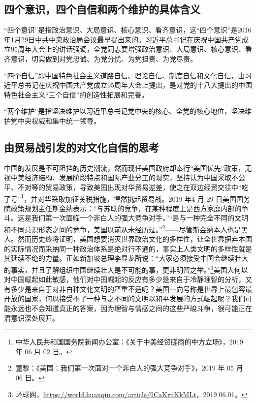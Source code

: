 \documentclass{ctexart}
\begin{document}
\subsection{四个意识，四个自信和两个维护的具体含义}
“四个意识”是指政治意识、大局意识、核心意识、看齐意识，这“四个意识”是2016年1月29日中共中央政治局会议最早提出来的。习近平总书记在庆祝中国共产党成立95周年大会上的讲话强调，全党同志要增强政治意识、大局意识、核心意识、看齐意识，切实做到对党忠诚、为党分忧、为党担责、为党尽责。

“四个自信”即中国特色社会主义道路自信、理论自信、制度自信和文化自信，由习近平总书记在庆祝中国共产党成立95周年大会上提出，是对党的十八大提出的中国特色社会主义“三个自信”的创造性拓展和完善。

“两个维护”是指坚决维护以习近平总书记党中央的核心、全党的核心地位，坚决维护党中央权威和集中统一领导。

\subsection{由贸易战引发的对文化自信的思考}
中国的发展是不可阻挡的历史潮流，然而现任美国政府却奉行“美国优先”政策，无视中美经济结构、发展阶段特点和国际产业分工的现实，坚持认为中国采取不公平、不对等的贸易政策，导致美国出现对华贸易逆差，使之在双边经贸交往中“吃了亏”\footnote{中华人民共和国国务院新闻办公室：《关于中美经贸磋商的中方立场》，2019 年 06 月 02 日。}，并对华采取加征关税措施，悍然挑起贸易战。2019 年4 月 29 日美国国务院政策规划主任斯金纳表示：“与苏联的竞争，在某种程度上是西方家庭内部的争斗。这是我们第一次面临一个非白人的强大竞争对手。”“是与一种完全不同的文明和不同意识形态之间的竞争，美国以前从未经历过。”\footnote{童黎：《美国：我们第一次面对一个非白人的强大竞争对手》，2019 年 05 月 06 日。}——尽管斯金纳本人也是黑人。然而历史终将证明，美国想要消灭世界政治文化的多样性，让全世界摒弃本国的实际情况而采纳同一种政治体系是绝对行不通的，事实上人类文明的多样性就是其延续不绝的力量。正如新加坡总理李显龙所说：“大家必须接受中国会继续壮大的事实，并且了解组织中国继续壮大是不可能的事，更非明智之举。”\footnote{环球网，\url{https://world.huanqiu.com/article/9CaKrnKkMLt}，2019.06.01。}美国人何以对中国崛起如此敏感，他们对中国崛起的反应有多少是来自于冷静理智的分析，又有多少是来自于对非白种文化文明的严重不适呢？美国一向号称是世界上最包容最开放的国家，何以接受不了一种与之不同的文明以和平发展的方式崛起呢？我们可能永远也不会知道真正的答案，因为理智与情感之间的这些严峻斗争，很可能正在潜意识深处展开。
\end{document}
